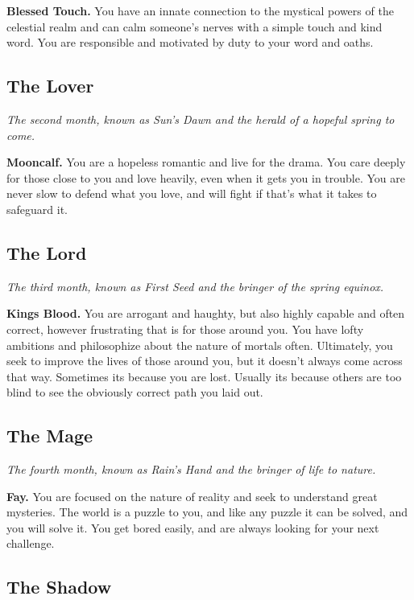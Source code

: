 \documentclass[12pt,letterpaper,twocolumn,openany,nodeprecatedcode,bg=none]{dndbook}
\let\oldsubsection\subsection
\renewcommand{\subsection}[1]{%
  \needspace{5\baselineskip}%
  \oldsubsection{#1}%
}
\begin{document}
\textbf{Blessed Touch.} You have an innate connection to the mystical
powers of the celestial realm and can calm someone's nerves with a
simple touch and kind word. You are responsible and motivated by duty to
your word and oaths.

\subsection{The Lover}\label{the-lover}

\emph{The second month, known as Sun's Dawn and the herald of a hopeful
spring to come.}

\textbf{Mooncalf.} You are a hopeless romantic and live for the drama.
You care deeply for those close to you and love heavily, even when it
gets you in trouble. You are never slow to defend what you love, and
will fight if that's what it takes to safeguard it.

\subsection{The Lord}\label{the-lord}

\emph{The third month, known as First Seed and the bringer of the spring
equinox.}

\textbf{Kings Blood.} You are arrogant and haughty, but also highly
capable and often correct, however frustrating that is for those around
you. You have lofty ambitions and philosophize about the nature of
mortals often. Ultimately, you seek to improve the lives of those around
you, but it doesn't always come across that way. Sometimes its because
you are lost. Usually its because others are too blind to see the
obviously correct path you laid out.

\subsection{The Mage}\label{the-mage}

\emph{The fourth month, known as Rain's Hand and the bringer of life to
nature.}

\textbf{Fay.} You are focused on the nature of reality and seek to
understand great mysteries. The world is a puzzle to you, and like any
puzzle it can be solved, and you will solve it. You get bored easily,
and are always looking for your next challenge.

\subsection{The Shadow}\label{the-shadow}
\end{document}
